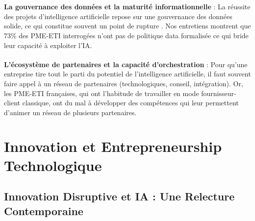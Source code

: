 \\\\
\textbf{La gouvernance des données et la maturité informationnelle} : La réussite des projets d’intelligence artificielle repose sur une gouvernance des données solide, ce qui constitue souvent un point de rupture \cite{wang2024data_governance}. Nos entretiens montrent que 73\% des PME-ETI interrogées n’ont pas de politique data formalisée ce qui bride leur capacité à exploiter l’IA.
\\\\
\textbf{L'écosystème de partenaires et la capacité d'orchestration} : Pour qu’une entreprise tire tout le parti du potentiel de l’intelligence artificielle, il faut souvent faire appel à un réseau de partenaires (technologiques, conseil, intégration). Or, les PME-ETI françaises, qui ont l’habitude de travailler en mode fournisseur-client classique, ont du mal à développer des compétences qui leur permettent d’animer un réseau de plusieurs partenaires.

\section{Innovation et Entrepreneurship Technologique}

\subsection{Innovation Disruptive et IA : Une Relecture Contemporaine}

